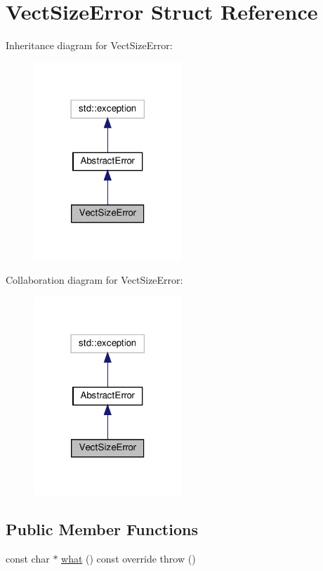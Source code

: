 \hypertarget{structVectSizeError}{}\section{Vect\+Size\+Error Struct Reference}
\label{structVectSizeError}


Inheritance diagram for Vect\+Size\+Error\+:\nopagebreak
\begin{figure}[H]
\begin{center}
\leavevmode
\includegraphics[width=158pt]{structVectSizeError__inherit__graph}
\end{center}
\end{figure}


Collaboration diagram for Vect\+Size\+Error\+:\nopagebreak
\begin{figure}[H]
\begin{center}
\leavevmode
\includegraphics[width=158pt]{structVectSizeError__coll__graph}
\end{center}
\end{figure}
\subsection*{Public Member Functions}
\begin{DoxyCompactItemize}
\item 
const char $\ast$ \hyperlink{structVectSizeError_af92248320a9fb06b025662736a742c9e}{what} () const override  throw ()
\end{DoxyCompactItemize}


